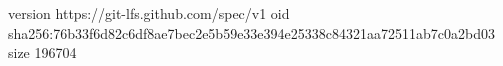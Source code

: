 version https://git-lfs.github.com/spec/v1
oid sha256:76b33f6d82c6df8ae7bec2e5b59e33e394e25338c84321aa72511ab7c0a2bd03
size 196704
